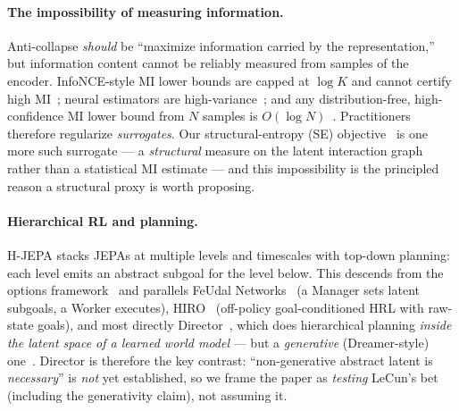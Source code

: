 \documentclass{article}
\begin{document}
\paragraph{The impossibility of measuring information.}
Anti-collapse \emph{should} be ``maximize information carried by the
representation,'' but information content cannot be reliably measured from samples
of the encoder. InfoNCE-style MI lower bounds are capped at $\log K$ and cannot
certify high MI~\citep{poole2019variational}; neural estimators are
high-variance~\citep{belghazi2018mine}; and any distribution-free, high-confidence
MI lower bound from $N$ samples is $O(\log N)$~\citep{mcallester2020formal}.
Practitioners therefore regularize \emph{surrogates}. Our structural-entropy (SE)
objective~\citep{li2016structural} is one more such surrogate --- a
\emph{structural} measure on the latent interaction graph rather than a
statistical MI estimate --- and this impossibility is the principled reason a
structural proxy is worth proposing.

\paragraph{Hierarchical RL and planning.}
H-JEPA stacks JEPAs at multiple levels and timescales with top-down planning:
each level emits an abstract subgoal for the level below. This descends from the
options framework~\citep{sutton1999options} and parallels FeUdal
Networks~\citep{vezhnevets2017feudal} (a Manager sets latent subgoals, a Worker
executes), HIRO~\citep{nachum2018hiro} (off-policy goal-conditioned HRL with
raw-state goals), and most directly Director~\citep{hafner2022director}, which
does hierarchical planning \emph{inside the latent space of a learned world
model} --- but a \emph{generative} (Dreamer-style) one~\citep{hafner2025dreamerv3}.
Director is therefore the key contrast: ``non-generative abstract latent is
\emph{necessary}'' is \emph{not} yet established, so we frame the paper as
\emph{testing} LeCun's bet (including the generativity claim), not assuming it.
\end{document}
